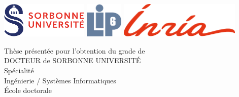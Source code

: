 %

\newcommand{\jurymember}[5]{\hspace{1.5em}\textbf{{#1} \textsc{{#2}}}, {#3}, {#4} \hfill \textit{{#5}}\\}

\begin{titlepage}
	\begin{flushleft}
      \includegraphics[height=1.7cm]{figures/sorbonne.pdf}
      \hfill
      \includegraphics[height=1.7cm]{figures/LogoLIP6.pdf}
      \hfill
      \includegraphics[height=1.7cm]{figures/inria.pdf}
	\end{flushleft}
	\vfill
	\begin{center}
        \vspace{1em}
        {\large Thèse présentée pour l'obtention du grade de}\\
        \vspace{1em}
        {\LARGE DOCTEUR de SORBONNE UNIVERSITÉ}\\
        \vspace{2em}
		{\small Spécialité}\\
		\vspace{0.5em}
		{\Large Ingénierie / Systèmes Informatiques}\\
		\vspace{2em}
        {\large École doctorale}\\
		\vspace{0.5em}

\end{center}
\end{titlepage}
